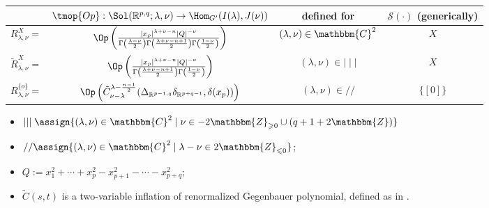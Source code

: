 \renewcommand{\arraystretch}{3.5}
\scriptsize
\begin{center}
\begin{tabular}{|c|c|c|c|}
  \hline
  & $\tmop{Op}:\Sol(\mathbb{R}^{p,q};\lambda,\nu)\to\Hom_{G'}(I(\lambda),J(\nu))$ & defined for &
  $\mathcal{S} (\cdot)$ (generically)\\
  \hline
  $R_{\lambda, \nu}^X=$ & $\Op\left( \frac{| x_p |^{\lambda + \nu - n} | Q |^{-
  \nu}}{\Gamma \left( \frac{\lambda - \nu}{2} \right) \Gamma \left(
  \frac{\lambda + \nu - n + 1}{2} \right) \Gamma \left( \frac{1 - \nu}{2}
  \right)} \right)$ & $(\lambda,\nu)\in\mathbbm{C}^2$ & $X$\\
  \hline
  $\tilde{R}^X_{\lambda, \nu}=$ & $\Op\left(  \frac{| x_p |^{\lambda + \nu - n} | Q |^{-
  \nu}}{ \Gamma \left(
  \frac{\lambda + \nu - n + 1}{2} \right) \Gamma \left( \frac{1 - \nu}{2}
  \right)} \right)$ & $(\lambda,\nu)\in\mid \mid \mid$ & $X$\\
  \hline
  $R_{\lambda, \nu}^{\{ o \}}=$ & $\Op\left(  \tilde{C}_{\nu - \lambda}^{\lambda - \frac{n
  - 1}{2}} ({\Delta}_{\mathbb{R}^{p-1,q}} {\delta}_{\mathbb{R}^{p+q-1}}, \delta (x_p)) \right)$ & $(\lambda,\nu)\in/ /$ & $\{ [0]
  \}$\\
  \hline
\end{tabular}
\end{center}
\vspace{-1em}
\begin{itemize}
	\item $\mid \mid \mid \assign \{ (\lambda, \nu) \in \mathbbm{C}^2 \mid \nu \in
	- 2\mathbbm{Z}_{\geqslant 0} \cup (q + 1 + 2\mathbbm{Z}) \}$ \item $/ / \assign
\{ (\lambda, \nu) \in \mathbbm{C}^2 \mid \lambda - \nu \in
2\mathbbm{Z}_{\leqslant 0} \}$;
\item $Q:=x_1^2+\cdots+x_p^2-x_{p+1}^2-\cdots-x_{p+q}^2$;
\item $\tilde{C}(s,t)$ is a two-variable inflation of renormalized Gegenbauer polynomial, defined as in \cite{kobayashi2015symmetry}.
\end{itemize}
